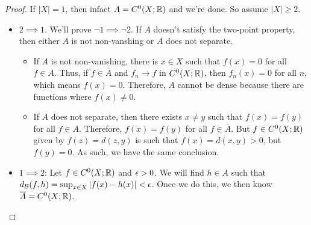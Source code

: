 \documentclass{report}
\begin{document}
\begin{proof}
    If $|X| = 1$, then infact $A = C^0(X; \RR)$ and we're done. So assume $|X| \geq 2$. 
    \begin{itemize}
        \item $2 \implies 1$. We'll prove $\neg 1 \implies \neg 2$. If $A$ doesn't satisfy the two-point property, then either $A$ is not non-vanshing or $A$ does not separate.
        \begin{itemize}
            \item If $A$ is not non-vanishing, there is $x \in X$ such that $f(x) = 0$ for all $f \in A$. Thus, if $f \in \overline A$ and $f_n \to f$ in $C^0(X; \RR)$, then $f_n(x) = 0$ for all $n$, which means $f(x) = 0$. Therefore, $A$ cannot be dense because there are functions where $f(x) \neq 0$. 
            \item If $A$ does not separate, then there exists $x \neq y$ such that $f(x) = f(y)$ for all $f \in A$. Therefore, $f(x) = f(y)$ for all $f \in \overline A$. But $f \in C^0(X; \RR)$ given by $f(z) = d(z, y)$ is such that $f(x) = d(x,y) > 0$, but $f(y) = 0$. As such, we have the same conclusion.
        \end{itemize}
        \item $1 \implies 2$: Let $f \in C^0(X; \RR)$ and $\epsilon > 0$. We will find $h \in A$ such that $d_{\mathcal B}(f, h) = \sup_{x\in X} | f(x)  - h(x)| < \epsilon$. Once we do this, we then know $\overline A = C^0(X; \RR)$. 
        

\end{itemize}
\end{proof}
\end{document}
